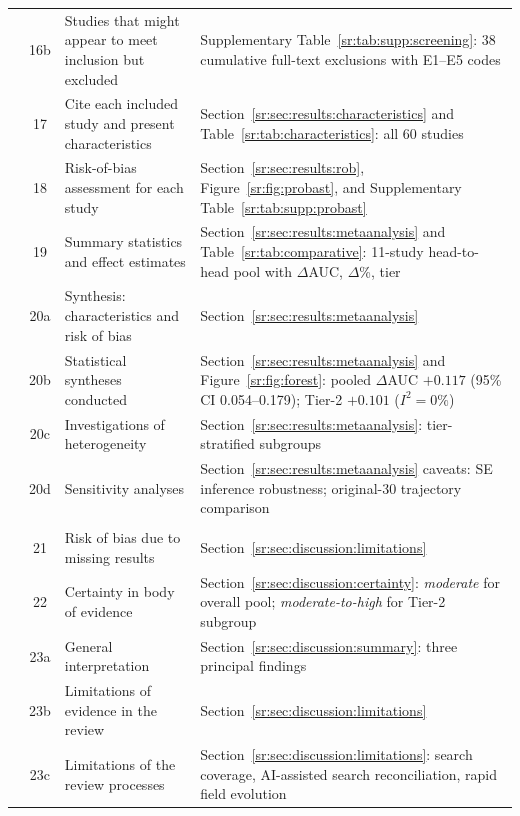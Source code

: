 \begin{longtable}{@{}p{1.6cm}cp{4.6cm}p{7.4cm}@{}}
         & 16b & Studies that might appear to meet inclusion but excluded & Supplementary Table~\ref{sr:tab:supp:screening}: 38 cumulative full-text exclusions with E1--E5 codes \\
         & 17 & Cite each included study and present characteristics & Section~\ref{sr:sec:results:characteristics} and Table~\ref{sr:tab:characteristics}: all 60 studies \\
         & 18 & Risk-of-bias assessment for each study & Section~\ref{sr:sec:results:rob}, Figure~\ref{sr:fig:probast}, and Supplementary Table~\ref{sr:tab:supp:probast} \\
         & 19 & Summary statistics and effect estimates & Section~\ref{sr:sec:results:metaanalysis} and Table~\ref{sr:tab:comparative}: 11-study head-to-head pool with $\Delta$AUC, $\Delta$\%, tier \\
         & 20a & Synthesis: characteristics and risk of bias & Section~\ref{sr:sec:results:metaanalysis} \\
         & 20b & Statistical syntheses conducted & Section~\ref{sr:sec:results:metaanalysis} and Figure~\ref{sr:fig:forest}: pooled $\Delta$AUC $+0.117$ (95\% CI 0.054--0.179); Tier-2 $+0.101$ ($I^2 = 0\%$) \\
         & 20c & Investigations of heterogeneity & Section~\ref{sr:sec:results:metaanalysis}: tier-stratified subgroups \\
         & 20d & Sensitivity analyses & Section~\ref{sr:sec:results:metaanalysis} caveats: SE inference robustness; original-30 trajectory comparison \\
\addlinespace
\multicolumn{4}{@{}l}{\textbf{DISCUSSION}} \\
         & 21 & Risk of bias due to missing results & Section~\ref{sr:sec:discussion:limitations} \\
         & 22 & Certainty in body of evidence & Section~\ref{sr:sec:discussion:certainty}: \emph{moderate} for overall pool; \emph{moderate-to-high} for Tier-2 subgroup \\
         & 23a & General interpretation & Section~\ref{sr:sec:discussion:summary}: three principal findings \\
         & 23b & Limitations of evidence in the review & Section~\ref{sr:sec:discussion:limitations} \\
         & 23c & Limitations of the review processes & Section~\ref{sr:sec:discussion:limitations}: search coverage, AI-assisted search reconciliation, rapid field evolution \\

\end{longtable}
